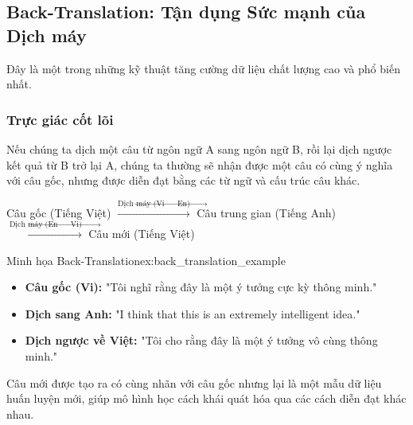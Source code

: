 \subsection{Back-Translation: Tận dụng Sức mạnh của Dịch máy}
\label{ssec:back_translation}
Đây là một trong những kỹ thuật tăng cường dữ liệu chất lượng cao và phổ biến nhất.

\subsubsection{Trực giác cốt lõi}
Nếu chúng ta dịch một câu từ ngôn ngữ A sang ngôn ngữ B, rồi lại dịch ngược kết quả từ B trở lại A, chúng ta thường sẽ nhận được một câu có cùng ý nghĩa với câu gốc, nhưng được diễn đạt bằng các từ ngữ và cấu trúc câu khác.

\begin{tcolorbox}[
    title=Quy trình Back-Translation,
    colback=blue!5!white, colframe=blue!75!black, fonttitle=\bfseries
]
Câu gốc (Tiếng Việt) $\xrightarrow{\text{Dịch máy (Vi } \rightarrow \text{ En)}}$ Câu trung gian (Tiếng Anh) $\xrightarrow{\text{Dịch máy (En } \rightarrow \text{ Vi)}}$ Câu mới (Tiếng Việt)
\end{tcolorbox}

\begin{example}{Minh họa Back-Translation}{ex:back_translation_example}
    \begin{itemize}
        \item \textbf{Câu gốc (Vi):} "Tôi nghĩ rằng đây là một ý tưởng cực kỳ thông minh."
        \item \textbf{Dịch sang Anh:} "I think that this is an extremely intelligent idea."
        \item \textbf{Dịch ngược về Việt:} "Tôi cho rằng đây là một ý tưởng vô cùng thông minh."
    \end{itemize}
    Câu mới được tạo ra có cùng nhãn với câu gốc nhưng lại là một mẫu dữ liệu huấn luyện mới, giúp mô hình học cách khái quát hóa qua các cách diễn đạt khác nhau.
\end{example}

